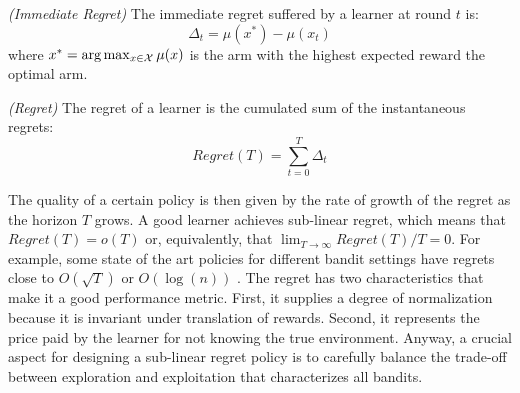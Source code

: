 \begin{definition}\label{def:immediateregret} \emph{(Immediate Regret)}
The immediate regret suffered by a learner at round $t$ is:
\begin{equation} 
\Delta_t = \mu(x^*) - \mu(x_t)
\end{equation}
where $x^* = \arg\max_{x\in\mathcal{X}}\mu(x)$ is the arm with the highest expected reward \ie the optimal arm.
\end{definition}
\begin{definition}\label{def:regret} \emph{(Regret)}
The regret of a learner is the cumulated sum of the instantaneous regrets:
\begin{equation}
Regret(T) = \sum_{t=0}^T\Delta_t
\end{equation}
\end{definition}

The quality of a certain policy is then given by the rate of growth of the regret as the horizon $T$ grows. A good learner achieves sub-linear regret, which means that $Regret(T) = o(T)$ or, equivalently, that $\lim_{T\to\infty}Regret(T)/T = 0$. For example, some state of the art policies for different bandit settings have regrets close to $O(\sqrt{T})$ or $O(\log(n))$ \cite{lattimore2019bandit}. The regret has two characteristics that make it a good performance metric. First, it supplies a degree of normalization because it is invariant under translation of rewards. Second, it represents the price paid by the learner for not knowing the true environment. Anyway, a crucial aspect for designing a sub-linear regret policy is to carefully balance the trade-off between exploration and exploitation that characterizes all bandits.

